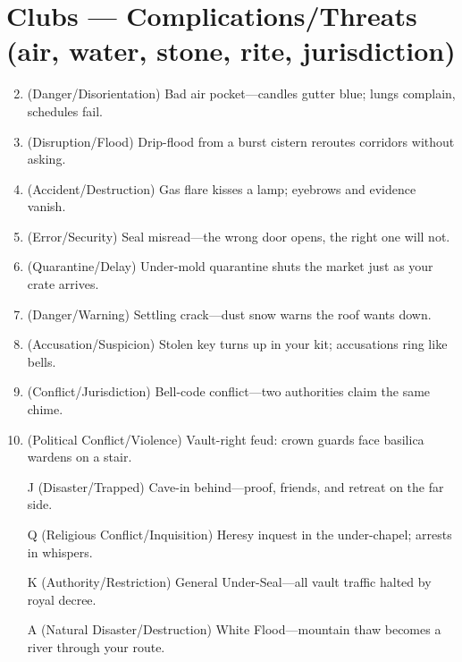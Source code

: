 \section*{Clubs --- Complications/Threats (air, water, stone, rite, jurisdiction)}
\label{sec:aeler-complications}
\begin{enumerate}
\setcounter{enumi}{1}
\item (Danger/Disorientation) Bad air pocket---candles gutter blue; lungs complain, schedules fail.
\item (Disruption/Flood) Drip-flood from a burst cistern reroutes corridors without asking.
\item (Accident/Destruction) Gas flare kisses a lamp; eyebrows and evidence vanish.
\item (Error/Security) Seal misread---the wrong door opens, the right one will not.
\item (Quarantine/Delay) Under-mold quarantine shuts the market just as your crate arrives.
\item (Danger/Warning) Settling crack---dust snow warns the roof wants down.
\item (Accusation/Suspicion) Stolen key turns up in your kit; accusations ring like bells.
\item (Conflict/Jurisdiction) Bell-code conflict---two authorities claim the same chime.
\item (Political Conflict/Violence) Vault-right feud: crown guards face basilica wardens on a stair.
\item[J] (Disaster/Trapped) Cave-in behind---proof, friends, and retreat on the far side.
\item[Q] (Religious Conflict/Inquisition) Heresy inquest in the under-chapel; arrests in whispers.
\item[K] (Authority/Restriction) General Under-Seal---all vault traffic halted by royal decree.
\item[A] (Natural Disaster/Destruction) White Flood---mountain thaw becomes a river through your route.
\end{enumerate}

